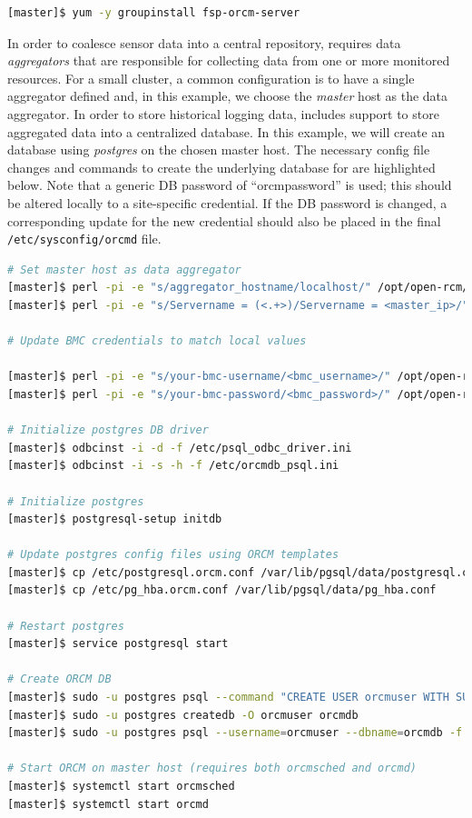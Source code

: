 \documentclass[letterpaper]{article}
\begin{document}
\begin{lstlisting}[language=bash]
[master]$ yum -y groupinstall fsp-orcm-server
\end{lstlisting}

In order to coalesce sensor data into a central repository, \ORCM{} requires
data {\em aggregators} that are responsible for collecting data from one or
more monitored resources. For a small cluster, a common configuration is to
have a single aggregator defined and, in this example, we choose the {\em master} host
as the data aggregator. In order to store historical logging data, \ORCM{}
includes support to store aggregated data into a centralized database. In this
example, we will create an \ORCM{} database using {\em postgres} on the chosen
master host. The necessary config file changes and commands to create the
underlying database for \ORCM{} are highlighted below. Note that a generic DB
password of ``orcmpassword'' is used; this should be altered locally to a
site-specific credential. If the DB password is changed, a corresponding update
for the new credential should also be placed in the final
\texttt{/etc/sysconfig/orcmd} file.

\begin{lstlisting}[language=bash,keywords={},upquote=true,keepspaces]
# Set master host as data aggregator
[master]$ perl -pi -e "s/aggregator_hostname/localhost/" /opt/open-rcm/etc/orcm-site.xml
[master]$ perl -pi -e "s/Servername = (<.+>)/Servername = <master_ip>/" /etc/orcmdb_psql.ini

# Update BMC credentials to match local values

[master]$ perl -pi -e "s/your-bmc-username/<bmc_username>/" /opt/open-rcm/etc/openmpi-mca-params.conf
[master]$ perl -pi -e "s/your-bmc-password/<bmc_password>/" /opt/open-rcm/etc/openmpi-mca-params.conf

# Initialize postgres DB driver
[master]$ odbcinst -i -d -f /etc/psql_odbc_driver.ini
[master]$ odbcinst -i -s -h -f /etc/orcmdb_psql.ini 

# Initialize postgres
[master]$ postgresql-setup initdb

# Update postgres config files using ORCM templates
[master]$ cp /etc/postgresql.orcm.conf /var/lib/pgsql/data/postgresql.conf
[master]$ cp /etc/pg_hba.orcm.conf /var/lib/pgsql/data/pg_hba.conf

# Restart postgres
[master]$ service postgresql start

# Create ORCM DB
[master]$ sudo -u postgres psql --command "CREATE USER orcmuser WITH SUPERUSER PASSWORD 'orcmpassword';"
[master]$ sudo -u postgres createdb -O orcmuser orcmdb
[master]$ sudo -u postgres psql --username=orcmuser --dbname=orcmdb -f /etc/orcmdb_psql.sql

# Start ORCM on master host (requires both orcmsched and orcmd)
[master]$ systemctl start orcmsched
[master]$ systemctl start orcmd
\end{lstlisting}
\end{document}
